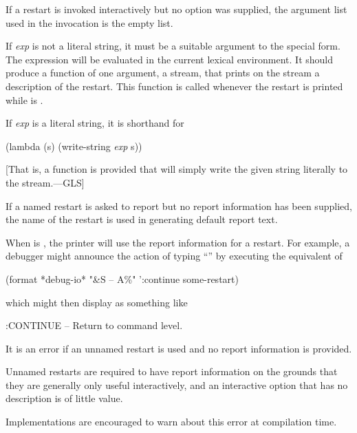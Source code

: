 \begin{defmac}
\begin{flushdesc}
    If a restart is invoked interactively but no  option
    was supplied, the argument list used in the invocation is the empty
    list.

\item[\cd{:report \emph{exp}}]

    If \emph{exp} is not a literal string, it must be a suitable argument to the
     special form. The expression  will be evaluated
    in the current lexical environment. It should produce a function of one
    argument, a stream, that prints on the stream a description of the
    restart. This function is called whenever the restart is printed while
     is .

    If \emph{exp} is a literal string, it is shorthand for
\begin{lisp}
(lambda (s) (write-string \emph{exp} s))
\end{lisp}
[That is, a function is provided that will simply write the given string literally
to the stream.---GLS]

    If a named restart is asked to report but no report information has been
    supplied, the name of the restart is used in generating default report text.

    When  is , the printer will use the report information for
    a restart. For example, a debugger might announce the action of typing
    ``'' by executing the equivalent of
\begin{lisp}
(format *debug-io* "{\Xtilde}\&{\Xtilde}S -- {\Xtilde}A{\Xtilde}\%" ':continue some-restart)
\end{lisp}
    which might then display as something like
\begin{lisp}
:CONTINUE -- Return to command level.
\end{lisp}

    It is an error if an unnamed restart is used and no report information
    is provided.

\beforenoterule
    \begin{rationale}
    Unnamed restarts are required to have report information
    on the grounds that they are generally only useful interactively,
    and an interactive option that has no description is of little value.
    \end{rationale}
\betweennoterule
\begin{implementation}
      Implementations are encouraged to warn about this error at compilation time.


\end{implementation}
\end{flushdesc}
\end{defmac}
